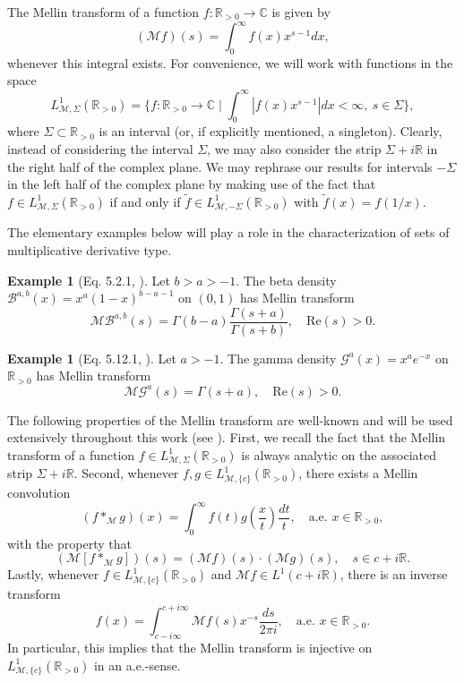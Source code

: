 \documentclass[a4paper,12pt,oneside]{article}
\theoremstyle{definition}
\newtheorem{ex}[defi]{Example}
\newcommand{\C}{\mathbb{C}}
\newcommand{\R}{\mathbb{R}}
\newcommand{\MT}[1]{\mathcal{M}#1}
\begin{document}
The Mellin transform of a function $f:\R_{>0}\to\C$ is given by
    $$(\MT{f})(s) = \int_{0}^\infty f(x) x^{s-1} dx, $$  
whenever this integral exists. For convenience, we will work with functions in the space
    $$ L_{\MT{},\Sigma}^{1}(\R_{>0}) = \{ f:\R_{>0}\to\C \mid \int_0^\infty |f(x)x^{s-1}| dx < \infty ,\ s\in\Sigma  \}, $$
where $\Sigma\subset\R_{>0}$ is an interval (or, if explicitly mentioned, a singleton). Clearly, instead of considering the interval $\Sigma$, we may also consider the strip $\Sigma+i\R$ in the right half of the complex plane. We may rephrase our results for intervals $-\Sigma$ in the left half of the complex plane by making use of the fact that $f\in L_{\MT{},\Sigma}^{1}(\R_{>0}) $ if and only if $\tilde{f}\in L_{\MT{},-\Sigma}^{1}(\R_{>0})$ with $\tilde{f}(x)=f(1/x)$.
\medbreak

The elementary examples below will play a role in the characterization of sets of multiplicative derivative type.

\begin{ex}[Eq. 5.2.1, \cite{DLMF}] \label{MDT_BETA}
    Let $b>a>-1$. The beta density $\mathcal{B}^{a,b}(x) = x^{a}(1-x)^{b-a-1}$ on $(0,1)$ has Mellin transform
        $$ \MT{\mathcal{B}^{a,b}}(s) = \Gamma(b-a) \frac{\Gamma(s+a)}{\Gamma(s+b)},\quad \text{Re}(s)>0. $$
\end{ex}

\begin{ex}[Eq. 5.12.1, \cite{DLMF}] \label{MDT_GAMMA}
    Let $a>-1$. The gamma density $ \mathcal{G}^a(x) = x^a e^{-x}$ on $\R_{>0}$ has Mellin transform
        $$ \MT{\mathcal{G}^a}(s) = \Gamma(s+a),\quad \text{Re}(s)>0.$$
\end{ex}

The following properties of the Mellin transform are well-known and will be used extensively throughout this work (see \cite[Thm. 1, 3 \& 7]{BJ:MT}). First, we recall the fact that the Mellin transform of a function $f\in L_{\MT{},\Sigma}^{1}(\R_{>0})$ is always analytic on the associated strip $\Sigma+i\R$. Second, whenever $f,g\in L_{\MT{},\{c\}}^{1}(\R_{>0})$, there exists a Mellin convolution
    $$(f\ast_{\mathcal{M}} g)(x) = \int_{0}^\infty f(t) g\left(\frac{x}{t}\right) \frac{dt}{t},\quad \text{a.e. } x\in\R_{>0},$$
with the property that
    $$ (\MT{[f\ast_{\mathcal{M}} g]})(s) = (\MT{f})(s) \cdot (\MT{g})(s),\quad s\in c+i\R. $$
Lastly, whenever $f\in L_{\MT{},\{c\}}^{1}(\R_{>0})$ and $\MT{f}\in L^1(c+i\R)$, there is an inverse transform
    $$ f(x) = \int_{c-i\infty}^{c+i\infty} \MT{f}(s) x^{-s} \frac{ds}{2\pi i},\quad \text{a.e. } x\in\R_{>0}.  $$
In particular, this implies that the Mellin transform is injective on $L_{\MT{},\{c\}}^{1}(\R_{>0})$ in an a.e.-sense.
\medbreak
\end{document}
